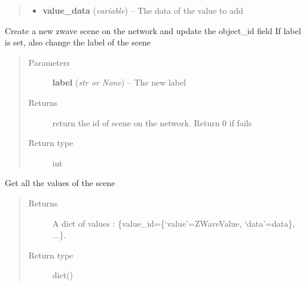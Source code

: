 \documentclass[letterpaper,10pt,english]{sphinxmanual}
\begin{document}
\begin{fulllineitems}
\begin{fulllineitems}
\begin{quote}
\begin{description}
\begin{itemize}
\item {} 
\textbf{value\_data} (\emph{variable}) -- The data of the value to add

\end{itemize}

\end{description}\end{quote}

\end{fulllineitems}


\begin{fulllineitems}
\label{scene:openzwave.scene.ZWaveScene.create}
Create a new zwave scene on the network and update the object\_id field
If label is set, also change the label of the scene
\begin{quote}\begin{description}
\item[{Parameters}] \leavevmode
\textbf{label} (\emph{str or None}) -- The new label

\item[{Returns}] \leavevmode
return the id of scene on the network. Return 0 if fails

\item[{Return type}] \leavevmode
int

\end{description}\end{quote}

\end{fulllineitems}


\begin{fulllineitems}
\label{scene:openzwave.scene.ZWaveScene.get_values}
Get all the values of the scene
\begin{quote}\begin{description}
\item[{Returns}] \leavevmode
A dict of values : \{value\_id=\{`value'=ZWaveValue, `data'=data\}, ...\}.

\item[{Return type}] \leavevmode
dict()

\end{description}\end{quote}


\end{fulllineitems}
\end{fulllineitems}
\end{document}
